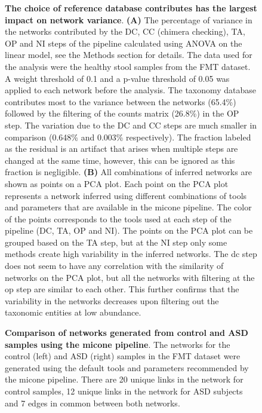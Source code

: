   \begin{figure}[H]
    \centering
      \caption{
      \textbf{The choice of reference database contributes has the largest impact on network variance}.
      \textbf{(A)} The percentage of variance in the networks contributed by the DC, CC (chimera checking), TA, OP and NI steps of the pipeline calculated using ANOVA on the linear model, see the Methods section for details.
      The data used for the analysis were the healthy stool samples from the FMT dataset.
      A weight threshold of 0.1 and a p-value threshold of 0.05 was applied to each network before the analysis.
      The taxonomy database contributes most to the variance between the networks (65.4\%) followed by the filtering of the counts matrix (26.8\%) in the OP step.
    The variation due to the DC and CC steps are much smaller in comparison (0.648\% and 0.003\% respectively).
      The fraction labeled as the residual is an artifact that arises when multiple steps are changed at the same time, however, this can be ignored as this fraction is negligible.
      \textbf{(B)} All combinations of inferred networks are shown as points on a PCA plot.
      Each point on the PCA plot represents a network inferred using different combinations of tools and parameters that are available in the \ac{micone} pipeline.
      The color of the points corresponds to the tools used at each step of the pipeline (DC, TA, OP and NI).
      The points on the PCA plot can be grouped based on the TA step, but at the NI step only some methods create high variability in the inferred networks.
      The \ac{dc} step does not seem to have any correlation with the similarity of networks on the PCA plot, but all the networks with filtering at the \ac{op} step are similar to each other.
      This further confirms that the variability in the networks decreases upon filtering out the taxonomic entities at low abundance.
    }
    \label{fig:figure6}
  \end{figure}


  \begin{figure}[H]
    \centering
    \caption{
      \textbf{Comparison of networks generated from control and ASD samples using the \ac{micone} pipeline}.
      The networks for the control (left) and ASD (right) samples in the FMT dataset were generated using the default tools and parameters recommended by the \ac{micone} pipeline.
      There are 20 unique links in the network for control samples, 12 unique links in the network for ASD subjects and 7 edges in common between both networks.
    }
    \label{fig:figure7}
  \end{figure}


